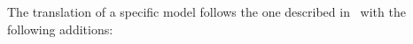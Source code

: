 

The translation of a specific \SCXML model follows the one described
in~\cite{MoSn16,MoSnHo18} with the following additions:




